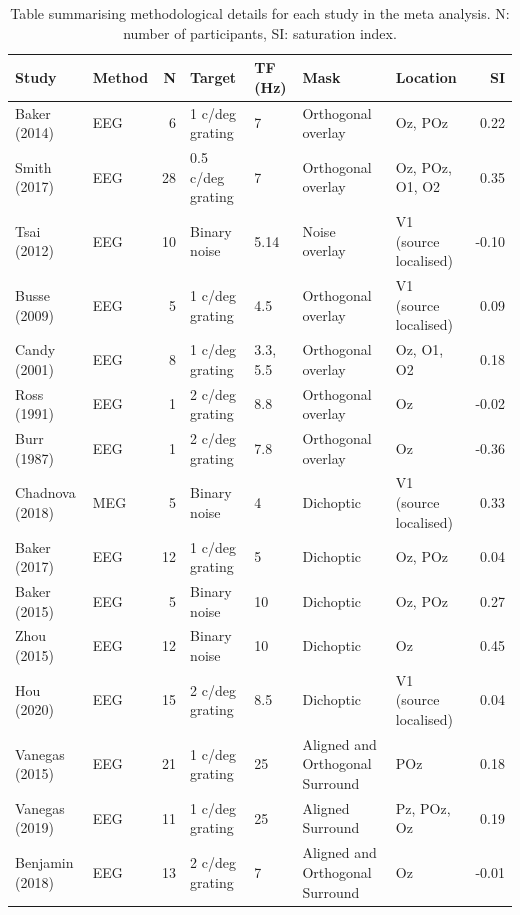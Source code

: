 \documentclass[]{article}
\begin{document}
\begin{table}

\caption{\label{tab:metatable}Table summarising methodological details for each study in the meta analysis. N: number of participants, SI: saturation index.}
\centering
\begin{tabular}[t]{l|l|r|l|l|l|l|r}
\hline
Study & Method & N & Target & TF (Hz) & Mask & Location & SI\\
\hline
Baker (2014) & EEG & 6 & 1 c/deg grating & 7 & Orthogonal overlay & Oz, POz & 0.22\\
\hline
Smith (2017) & EEG & 28 & 0.5 c/deg grating & 7 & Orthogonal overlay & Oz, POz, O1, O2 & 0.35\\
\hline
Tsai (2012) & EEG & 10 & Binary noise & 5.14 & Noise overlay & V1 (source localised) & -0.10\\
\hline
Busse (2009) & EEG & 5 & 1 c/deg grating & 4.5 & Orthogonal overlay & V1 (source localised) & 0.09\\
\hline
Candy (2001) & EEG & 8 & 1 c/deg grating & 3.3, 5.5 & Orthogonal overlay & Oz, O1, O2 & 0.18\\
\hline
Ross (1991) & EEG & 1 & 2 c/deg grating & 8.8 & Orthogonal overlay & Oz & -0.02\\
\hline
Burr (1987) & EEG & 1 & 2 c/deg grating & 7.8 & Orthogonal overlay & Oz & -0.36\\
\hline
Chadnova (2018) & MEG & 5 & Binary noise & 4 & Dichoptic & V1 (source localised) & 0.33\\
\hline
Baker (2017) & EEG & 12 & 1 c/deg grating & 5 & Dichoptic & Oz, POz & 0.04\\
\hline
Baker (2015) & EEG & 5 & Binary noise & 10 & Dichoptic & Oz, POz & 0.27\\
\hline
Zhou (2015) & EEG & 12 & Binary noise & 10 & Dichoptic & Oz & 0.45\\
\hline
Hou (2020) & EEG & 15 & 2 c/deg grating & 8.5 & Dichoptic & V1 (source localised) & 0.04\\
\hline
Vanegas (2015) & EEG & 21 & 1 c/deg grating & 25 & Aligned and Orthogonal Surround & POz & 0.18\\
\hline
Vanegas (2019) & EEG & 11 & 1 c/deg grating & 25 & Aligned Surround & Pz, POz, Oz & 0.19\\
\hline
Benjamin (2018) & EEG & 13 & 2 c/deg grating & 7 & Aligned and Orthogonal Surround & Oz & -0.01\\
\hline
\end{tabular}
\end{table}
\end{document}
